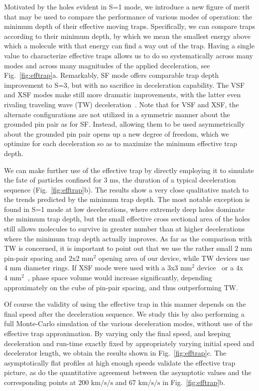 \documentclass[%
 reprint,
 amsmath,amssymb,
 aps,
prl,
]{revtex4-1}
\newcommand{\ST}{{S=3}}
\begin{document}
Motivated by the holes evident in S=1 mode, we introduce a new figure of merit that may be used to compare the performance of various modes of operation: the minimum depth of their effective moving traps.
Specifically, we can compare traps according to their minimum depth, by which we mean the smallest energy above which a molecule with that energy can find a way out of the trap.
Having a single value to characterize effective traps allows us to do so systematically across many modes and across many magnitudes of the applied deceleration, see Fig.~\ref{fig:efftrap}a. Remarkably, SF mode offers comparable trap depth improvement to \ST, but with no sacrifice in deceleration capability. 
The VSF and XSF modes make still more dramatic improvements, with the latter even rivaling traveling wave (TW) deceleration~\cite{Osterwalder2010}. 
Note that for VSF and XSF, the alternate configurations are not utilized in a symmetric manner about the grounded pin pair as for SF. 
Instead, allowing them to be used asymmetrically about the grounded pin pair opens up a new degree of freedom, which we optimize for each deceleration so as to maximize the minimum effective trap depth.

We can make further use of the effective trap by directly employing it to simulate the fate of particles confined for $3\text{ ms}$, the duration of a typical deceleration sequence (Fig.~\ref{fig:efftrap}b). 
The results show a very close qualitative match to the trends predicted by the minimum trap depth. 
The most notable exception is found in S=1 mode at low decelerations, where extremely deep holes dominate the minimum trap depth, but the small effective cross sectional area of the holes still allows molecules to survive in greater number than at higher decelerations where the minimum trap depth actually improves.
As far as the comparison with TW is concerned, it is important to point out that we use the rather small $2\text{ mm}$ pin-pair spacing and $2$x$2\text{ mm}^2$ opening area of our device, while TW devices use $4\text{ mm}$ diameter rings.
If XSF mode were used with a $3$x$3\text{ mm}^2$ device~\cite{Scharfenberg2009} or a $4$x$4\text{ mm}^2$~\cite{VandeMeerakker2005}, phase space volume would increase significantly, depending approximately on the cube of pin-pair spacing, and thus outperforming TW. 

Of course the validity of using the effective trap in this manner depends on the final speed after the deceleration sequence.
We study this by also performing a full Monte-Carlo simulation of the various deceleration modes, without use of the effective trap approximation.
By varying only the final speed, and keeping deceleration and run-time exactly fixed by appropriately varying initial speed and decelerator length, we obtain the results shown in Fig.~\ref{fig:efftrap}c. 
The asymptotically flat profiles at high enough speeds validate the effective trap picture, as do the quantitative agreement between the asymptotic values and the corresponding points at $200\text{ km/s/s}$ and $67\text{ km/s/s}$ in Fig.~\ref{fig:efftrap}b. 
\end{document}
